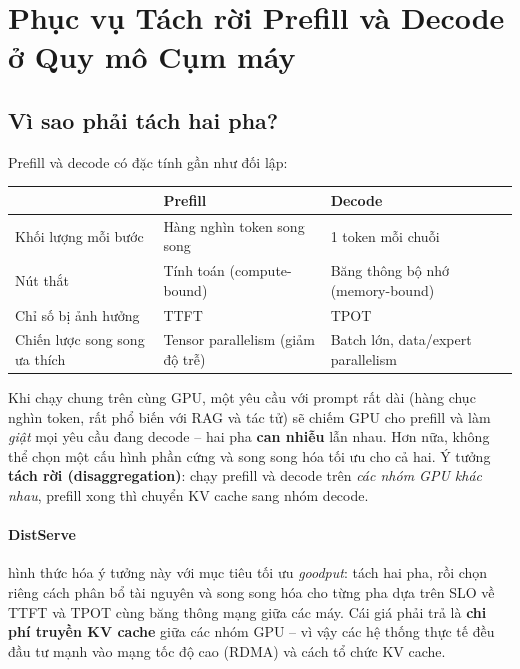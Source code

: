 
\section{Phục vụ Tách rời Prefill và Decode ở Quy mô Cụm máy \newtag}
\label{sec:disaggregated_serving}

\subsection{Vì sao phải tách hai pha?}
\label{ssec:why_disaggregate}
Prefill và decode có đặc tính gần như đối lập:
\begin{center}
\begin{tabular}{@{}lll@{}}
\toprule
 & \textbf{Prefill} & \textbf{Decode} \\
\midrule
Khối lượng mỗi bước & Hàng nghìn token song song & 1 token mỗi chuỗi \\
Nút thắt & Tính toán (compute-bound) & Băng thông bộ nhớ (memory-bound) \\
Chỉ số bị ảnh hưởng & TTFT & TPOT \\
Chiến lược song song ưa thích & Tensor parallelism (giảm độ trễ) & Batch lớn, data/expert parallelism \\
\bottomrule
\end{tabular}
\end{center}
Khi chạy chung trên cùng GPU, một yêu cầu với prompt rất dài (hàng chục nghìn token, rất phổ biến với RAG và tác tử) sẽ chiếm GPU cho prefill và làm \emph{giật} mọi yêu cầu đang decode -- hai pha \textbf{can nhiễu} lẫn nhau. Hơn nữa, không thể chọn một cấu hình phần cứng và song song hóa tối ưu cho cả hai. Ý tưởng \textbf{tách rời (disaggregation)}: chạy prefill và decode trên \emph{các nhóm GPU khác nhau}, prefill xong thì chuyển KV cache sang nhóm decode.

\paragraph{DistServe \cite{zhong2024distserve}} hình thức hóa ý tưởng này với mục tiêu tối ưu \emph{goodput}: tách hai pha, rồi chọn riêng cách phân bổ tài nguyên và song song hóa cho từng pha dựa trên SLO về TTFT và TPOT cùng băng thông mạng giữa các máy. Cái giá phải trả là \textbf{chi phí truyền KV cache} giữa các nhóm GPU -- vì vậy các hệ thống thực tế đều đầu tư mạnh vào mạng tốc độ cao (RDMA) và cách tổ chức KV cache.

